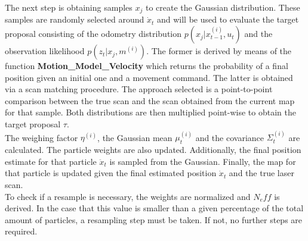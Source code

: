 The next step is obtaining samples $x_j$ to create the Gaussian distribution. These samples are randomly selected around $\dot x_t$ and will be used to evaluate the target proposal consisting
of the odometry distribution $p(x_j|x_{t-1}^{(i)}, u_t)$ and the observation likelihood $p(z_t| x_j, m^{(i)})$. The former is derived by means of the function \textbf{Motion\_Model\_Velocity} which returns the probability of a final position given an initial one and a movement command. The latter is obtained via a scan matching procedure. The approach selected is a point-to-point comparison between the true scan and the scan obtained from the current map for that sample. Both distributions are then multiplied point-wise to obtain the target proposal $\tau$.\\
The weighing factor $\eta^{(i)}$, the Gaussian mean $\mu_t^{(i)}$ and the covariance $\Sigma_t^{(i)}$ are calculated. The particle weights are also updated. Additionally, the final position estimate for that particle $\ddot x_t$ is sampled from the Gaussian. Finally, the map for that particle is updated given the final estimated position $\dot x_t$ and the true laser scan.\\
To check if a resample is necessary, the weights are normalized and $N_eff$ is derived. In the case that this value is smaller than a given percentage of the total amount of particles, a resampling step must be taken. If not, no further steps are required.



